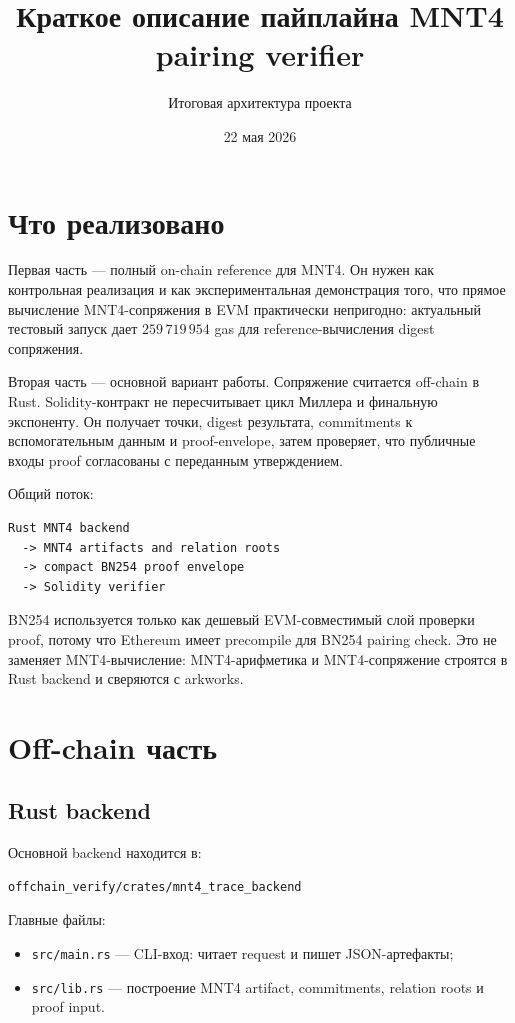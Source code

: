 \documentclass[12pt,a4paper]{article}
\title{Краткое описание пайплайна MNT4 pairing verifier}
\author{Итоговая архитектура проекта}
\date{22 мая 2026}
\begin{document}
\maketitle

\section{Что реализовано}
Первая часть --- полный on-chain reference для MNT4. Он нужен как контрольная реализация и как экспериментальная демонстрация того, что прямое вычисление MNT4-сопряжения в EVM практически непригодно: актуальный тестовый запуск дает $259\,719\,954$ gas для reference-вычисления digest сопряжения.

Вторая часть --- основной вариант работы. Сопряжение считается off-chain в Rust. Solidity-контракт не пересчитывает цикл Миллера и финальную экспоненту. Он получает точки, digest результата, commitments к вспомогательным данным и proof-envelope, затем проверяет, что публичные входы proof согласованы с переданным утверждением.

Общий поток:
\begin{lstlisting}
Rust MNT4 backend
  -> MNT4 artifacts and relation roots
  -> compact BN254 proof envelope
  -> Solidity verifier
\end{lstlisting}

BN254 используется только как дешевый EVM-совместимый слой проверки proof, потому что Ethereum имеет precompile для BN254 pairing check. Это не заменяет MNT4-вычисление: MNT4-арифметика и MNT4-сопряжение строятся в Rust backend и сверяются с arkworks.

\section{Off-chain часть}
\subsection{Rust backend}
Основной backend находится в:
\begin{lstlisting}
offchain_verify/crates/mnt4_trace_backend
\end{lstlisting}

Главные файлы:
\begin{itemize}
    \item \texttt{src/main.rs} --- CLI-вход: читает request и пишет JSON-артефакты;
    \item \texttt{src/lib.rs} --- построение MNT4 artifact, commitments, relation roots и proof input.
\end{itemize}
\end{document}
